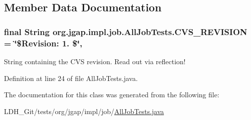 \subsection{Member Data Documentation}
\hypertarget{classorg_1_1jgap_1_1impl_1_1job_1_1_all_job_tests_ae1b8b8c74f2eb62b92cce3bd93661646}{
\subsubsection[{C\-V\-S\-\_\-\-R\-E\-V\-I\-S\-I\-O\-N}]{\setlength{\rightskip}{0pt plus 5cm}final String org.\-jgap.\-impl.\-job.\-All\-Job\-Tests.\-C\-V\-S\-\_\-\-R\-E\-V\-I\-S\-I\-O\-N = \char`\"{}\$Revision\-: 1. \$\char`\"{}\hspace{0.3cm}{\ttfamily [static]}, {\ttfamily [private]}}}\label{classorg_1_1jgap_1_1impl_1_1job_1_1_all_job_tests_ae1b8b8c74f2eb62b92cce3bd93661646}
String containing the C\-V\-S revision. Read out via reflection! 

Definition at line 24 of file All\-Job\-Tests.\-java.



The documentation for this class was generated from the following file\-:\begin{DoxyCompactItemize}
\item 
L\-D\-H\-\_\-\-Git/tests/org/jgap/impl/job/\hyperlink{_all_job_tests_8java}{All\-Job\-Tests.\-java}\end{DoxyCompactItemize}
